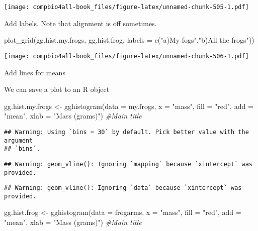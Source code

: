 \documentclass[
]{book}
\newenvironment{Shaded}{\begin{snugshade}}{\end{snugshade}}
\newcommand{\AttributeTok}[1]{\textcolor[rgb]{0.77,0.63,0.00}{#1}}
\newcommand{\CommentTok}[1]{\textcolor[rgb]{0.56,0.35,0.01}{\textit{#1}}}
\newcommand{\FunctionTok}[1]{\textcolor[rgb]{0.00,0.00,0.00}{#1}}
\newcommand{\NormalTok}[1]{#1}
\newcommand{\OtherTok}[1]{\textcolor[rgb]{0.56,0.35,0.01}{#1}}
\newcommand{\StringTok}[1]{\textcolor[rgb]{0.31,0.60,0.02}{#1}}
\begin{document}
\texttt{[image: compbio4all-book\_files/figure-latex/unnamed-chunk-505-1.pdf]}

Add labels. Note that alignment is off sometimes.

\begin{Shaded}
\begin{Highlighting}[]
\FunctionTok{plot\_grid}\NormalTok{(gg.hist.my.frogs, }
\NormalTok{          gg.hist.frog,}
          \AttributeTok{labels =} \FunctionTok{c}\NormalTok{(}\StringTok{"a)My fogs"}\NormalTok{,}\StringTok{"b)All the frogs"}\NormalTok{))}
\end{Highlighting}
\end{Shaded}

\texttt{[image: compbio4all-book\_files/figure-latex/unnamed-chunk-506-1.pdf]}

Add lines for means

We can save a plot to an R object

\begin{Shaded}
\begin{Highlighting}[]
\NormalTok{gg.hist.my.frogs }\OtherTok{\textless{}{-}} \FunctionTok{gghistogram}\NormalTok{(}\AttributeTok{data =}\NormalTok{ my.frogs,}
            \AttributeTok{x =} \StringTok{"mass"}\NormalTok{,}
            \AttributeTok{fill =} \StringTok{"red"}\NormalTok{,}
            \AttributeTok{add =} \StringTok{"mean"}\NormalTok{,}
            \AttributeTok{xlab =} \StringTok{"Mass (grams)"}\NormalTok{) }\CommentTok{\#Main title}
\end{Highlighting}
\end{Shaded}

\begin{verbatim}
## Warning: Using `bins = 30` by default. Pick better value with the argument
## `bins`.
\end{verbatim}

\begin{verbatim}
## Warning: geom_vline(): Ignoring `mapping` because `xintercept` was provided.
\end{verbatim}

\begin{verbatim}
## Warning: geom_vline(): Ignoring `data` because `xintercept` was provided.
\end{verbatim}

\begin{Shaded}
\begin{Highlighting}[]
\NormalTok{gg.hist.frog }\OtherTok{\textless{}{-}} \FunctionTok{gghistogram}\NormalTok{(}\AttributeTok{data =}\NormalTok{ frogarms,}
            \AttributeTok{x =} \StringTok{"mass"}\NormalTok{,}
            \AttributeTok{fill =} \StringTok{"red"}\NormalTok{,}
            \AttributeTok{add =} \StringTok{"mean"}\NormalTok{,}
            \AttributeTok{xlab =} \StringTok{"Mass (grams)"}\NormalTok{) }\CommentTok{\#Main title}
\end{Highlighting}
\end{Shaded}
\end{document}
